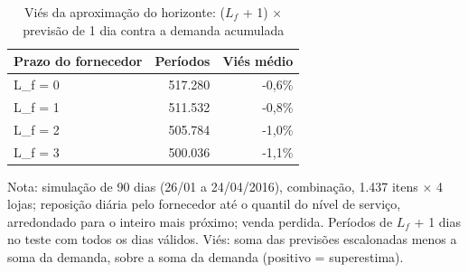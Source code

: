 \begin{table}[htbp]
\centering
\small
\caption{Viés da aproximação do horizonte: ($L_f$ + 1) × previsão de 1 dia contra a demanda acumulada}
\label{tab:tbr_vies_aproximacao}
\begin{tabular}{lrr}
\toprule
Prazo do fornecedor & Períodos & Viés médio \\
\midrule
L\_f = 0 & 517.280 & -0,6\% \\
L\_f = 1 & 511.532 & -0,8\% \\
L\_f = 2 & 505.784 & -1,0\% \\
L\_f = 3 & 500.036 & -1,1\% \\
\bottomrule
\end{tabular}
\par\smallskip
{\footnotesize Nota: simulação de 90 dias (26/01 a 24/04/2016), combinação, 1.437 itens × 4 lojas; reposição diária pelo fornecedor até o quantil do nível de serviço, arredondado para o inteiro mais próximo; venda perdida. Períodos de $L_f$ + 1 dias no teste com todos os dias válidos. Viés: soma das previsões escalonadas menos a soma da demanda, sobre a soma da demanda (positivo = superestima).}
\end{table}
